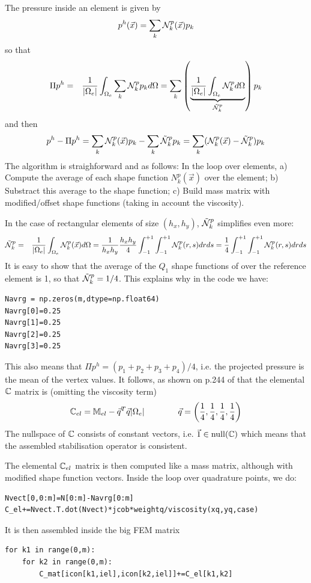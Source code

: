 The pressure inside an element is given by 
\[
p^h(\vec x) = \sum_k {\mathcal{N}}_k^p(\vec x) p_k
\]
so that 
\begin{eqnarray}
\Pi p^h 
&=& \frac{1}{|\Omega_e|} \int_{\Omega_e} \sum_k {\mathcal{N}}_k^p p_k d\Omega 
= \sum_k \left(\underbrace{\frac{1}{|\Omega_e|} \int_{\Omega_e} {\mathcal{N}}_k^p  d\Omega}_{\tilde{{\mathcal{N}}}_k^p} \right) p_k
\end{eqnarray}
and then
\[
p^h -\Pi p^h 
= \sum_k {\mathcal{N}}_k^p(\vec x) p_k - \sum_k \tilde{{\mathcal{N}}}_k^p p_k  
= \sum_k ({\mathcal{N}}_k^p(\vec x) - \tilde{{\mathcal{N}}}_k^p) p_k  
\]
The algorithm is straighforward and as follows:
In the loop over elements, a) Compute the average of each shape function $N_k^p(\vec x)$ over the element;
b) Substract this average to the shape function; c) Build mass matrix with modified/offset shape functions
(taking in account the viscosity).
 
In the case of rectangular elements of size $(h_x,h_y)$, $\tilde{{\mathcal{N}}}_k^p$ simplifies even more:
\begin{eqnarray}
\tilde{{\mathcal{N}}}_k^p 
&=& \frac{1}{|\Omega_e|} \int_{\Omega_e} {\mathcal{N}}_k^p(\vec x)   d\Omega  
= \frac{1}{h_xh_y} \frac{h_xh_y}{4} \int_{-1}^{+1} \int_{-1}^{+1} {\mathcal{N}}_k^p(r,s)   drds 
= \frac{1}{4} \int_{-1}^{+1} \int_{-1}^{+1} {\mathcal{N}}_k^p(r,s)   drds 
\end{eqnarray}
It is easy to show that the average of the $Q_1$ shape functions of over the reference 
element is 1, so that $ \tilde{{\mathcal{N}}}_k^p=1/4$. 
This explains why in the code we have:
\begin{lstlisting}
Navrg = np.zeros(m,dtype=np.float64)
Navrg[0]=0.25
Navrg[1]=0.25
Navrg[2]=0.25
Navrg[3]=0.25
\end{lstlisting}
This also means that $\Pi p^h = (p_1+p_2+p_3+p_4)/4$, i.e. the projected pressure
is the mean of the vertex values. It follows, as shown on p.244 of \cite{elsw} that 
the elemental ${\mathbb{C}}$ matrix is (omitting the viscosity term)
\[
{\mathbb{C}}_{el} = \mathbb{M}_{el} - \vec q^T \vec q |\Omega_e| \qquad\qquad 
\vec q=\left(\frac{1}{4},\frac{1}{4},\frac{1}{4},\frac{1}{4} \right)
\]
The nullspace of ${\mathbb{C}}$ consists of constant vectors, i.e. $\vec 1 \in \text{null}({\mathbb{C}})$ which means
that the assembled stabilisation operator is consistent.

The elemental ${\mathbb{C}}_{el}$ matrix is then computed like a mass matrix, although with modified 
shape function vectors. Inside the loop over quadrature points, we do:
\begin{lstlisting}
Nvect[0,0:m]=N[0:m]-Navrg[0:m]
C_el+=Nvect.T.dot(Nvect)*jcob*weightq/viscosity(xq,yq,case)
\end{lstlisting}
It is then assembled inside the big FEM matrix 
\begin{lstlisting}
for k1 in range(0,m):
    for k2 in range(0,m):
        C_mat[icon[k1,iel],icon[k2,iel]]+=C_el[k1,k2] 
\end{lstlisting}


